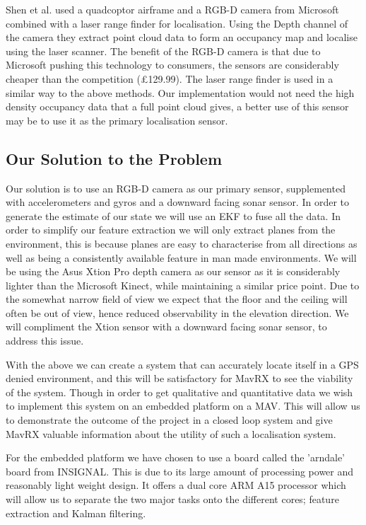 \documentclass[]{article}
\begin{document}
{Shen et al. \cite{Shen2012} used a quadcoptor airframe and a \ac{RGB-D} camera from Microsoft combined with a laser range finder for localisation. Using the Depth channel of the camera they extract point cloud data to form an occupancy map and localise using the laser scanner. The benefit of the \ac{RGB-D} camera is that due to Microsoft pushing this technology to consumers, the sensors are considerably cheaper than the competition (\pounds 129.99). The laser range finder is used in a similar way to the above methods. Our implementation would not need the high density occupancy data that a full point cloud gives, a better use of this sensor may be to use it as the primary localisation sensor.

\subsection{Our Solution to the Problem} %
\label{sub:our_solution_to_the_problem}

Our solution is to use an \ac{RGB-D} camera as our primary sensor, supplemented with accelerometers and gyros and a downward facing sonar sensor. In order to generate the estimate of our state we will use an \ac{EKF} to fuse all the data. In order to simplify our feature extraction we will only extract planes from the environment, this is because planes are easy to characterise from all directions as well as being a consistently available feature in man made environments. We will be using the Asus Xtion Pro depth camera as our sensor as it is considerably lighter than the Microsoft Kinect, while maintaining a similar price point. Due to the somewhat narrow field of view we expect that the floor and the ceiling will often be out of view, hence reduced observability in the elevation direction. We will compliment the Xtion sensor with a downward facing sonar sensor, to address this issue.

With the above we can create a system that can accurately locate itself in a \ac{GPS} denied environment, and this will be satisfactory for MavRX to see the viability of the system. Though in order to get qualitative and quantitative data we wish to implement this system on an embedded platform on a \ac{MAV}. This will allow us to demonstrate the outcome of the project in a closed loop system and give MavRX valuable information about the utility of such a localisation system. 

For the embedded platform we have chosen to use a board called the 'arndale' board from INSIGNAL. This is due to its large amount of processing power and reasonably light weight design. It offers a dual core ARM A15 processor which will allow us to separate the two major tasks onto the different cores; feature extraction and Kalman filtering. 

}
\end{document}
